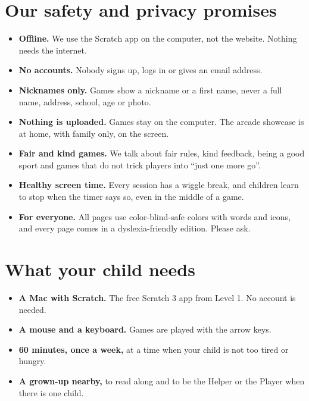 \documentclass[track=junior,level=2]{kidscode}
\begin{document}
\section{Our safety and privacy promises}
\begin{safety}
\begin{itemize}[itemsep=2pt]
  \item \textbf{Offline.} We use the Scratch app on the computer, not the website. Nothing needs the internet.
  \item \textbf{No accounts.} Nobody signs up, logs in or gives an email address.
  \item \textbf{Nicknames only.} Games show a nickname or a first name, never a full name,
        address, school, age or photo.
  \item \textbf{Nothing is uploaded.} Games stay on the computer. The arcade showcase is at home,
        with family only, on the screen.
  \item \textbf{Fair and kind games.} We talk about fair rules, kind feedback, being a good sport and
        games that do not trick players into \enquote{just one more go}.
  \item \textbf{Healthy screen time.} Every session has a wiggle break, and children learn to stop
        when the timer says so, even in the middle of a game.
  \item \textbf{For everyone.} All pages use color-blind-safe colors with words and icons, and every
        page comes in a dyslexia-friendly edition. Please ask.
\end{itemize}
\end{safety}

\section{What your child needs}
\begin{itemize}[itemsep=2pt]
  \item \textbf{A Mac with Scratch.} The free Scratch 3 app from Level 1. No account is needed.
  \item \textbf{A mouse and a keyboard.} Games are played with the arrow keys.
  \item \textbf{60 minutes, once a week,} at a time when your child is not too tired or hungry.
  \item \textbf{A grown-up nearby,} to read along and to be the Helper or the Player when there is one child.
\end{itemize}
\end{document}
